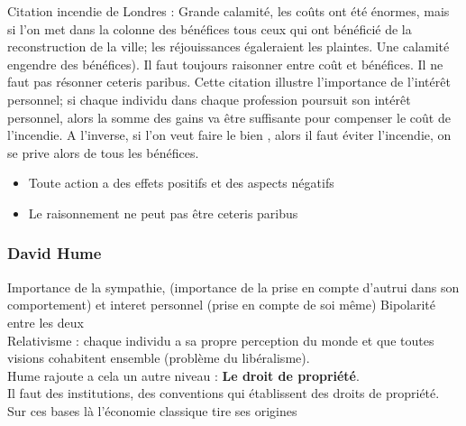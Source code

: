 \documentclass{article}
\begin{document}
Citation incendie de Londres : Grande calamité, les coûts ont été énormes, mais si l'on met dans la colonne des bénéfices tous ceux qui ont bénéficié de la reconstruction de la ville; les réjouissances égaleraient les plaintes. Une calamité engendre des bénéfices). Il faut toujours raisonner entre coût et bénéfices.
Il ne faut pas résonner ceteris paribus.
Cette citation illustre l'importance de l'intérêt personnel; si chaque individu dans chaque profession poursuit son intérêt personnel, alors la somme des gains va être suffisante pour compenser le coût de l'incendie. A l'inverse, si l'on veut faire le bien , alors il faut éviter l'incendie, on se prive alors de tous les bénéfices.
\\

\begin{itemize}
	\item Toute action a des effets positifs et des aspects négatifs
	\item Le raisonnement ne peut pas être ceteris paribus
\end{itemize}

\subsubsection{David Hume}

Importance de la sympathie, (importance de la prise en compte d'autrui dans son comportement) et interet personnel (prise en compte de soi même)  Bipolarité entre les deux \\
Relativisme : chaque individu a sa propre perception du monde et que toutes visions cohabitent ensemble (problème du libéralisme). \\
Hume rajoute a cela un autre niveau : \textbf{Le droit de propriété}.\\
Il faut des institutions, des conventions qui établissent des droits de propriété. \\
Sur ces bases là l'économie classique tire ses origines \\
\end{document}
